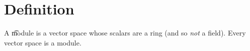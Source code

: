 
\section*{Definition}

A \t{module} is a vector space whose scalars are a ring (and so \textit{not} a field).
Every vector space is a module.

\blankpage